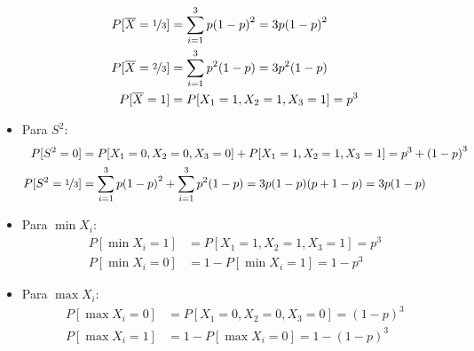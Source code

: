 \begin{ejercicio}
\begin{itemize}
\begin{align*}
               P[\overline{X} = \nicefrac{1}{3}] &= \sum_{i=1}^{3}p{(1-p)}^{2} = 3p{(1-p)}^{2} \\
               P[\overline{X} = \nicefrac{2}{3}] &= \sum_{i=1}^{3}p^2(1-p) = 3p^2(1-p) \\
               P[\overline{X} = 1] &= P[X_1 = 1, X_2 = 1, X_3 = 1] = p^3
           \end{align*}
       \item Para $S^2$:
           \begin{align*}
               P[S^2 = 0] &= P[X_1 = 0, X_2 = 0, X_3 = 0] + P[X_1 = 1, X_2 = 1, X_3 = 1] = p^3 + {(1-p)}^{3} \\
               P[S^2 = \nicefrac{1}{3}] &= \sum_{i=1}^{3} p{(1-p)}^{2} + \sum_{i=1}^{3}p^2(1-p) = 3p(1-p)(p+1-p) = 3p(1-p)
           \end{align*}
       \item Para $\min X_i$:
           \begin{align*}
               P[\min X_i = 1] &= P[X_1 = 1, X_2 = 1, X_3 = 1] = p^3 \\
               P[\min X_i = 0] &= 1-P[\min X_i = 1] = 1-p^3
           \end{align*}
       \item Para $\max X_i$:
           \begin{align*}
               P[\max X_i = 0] &= P[X_1 = 0, X_2 = 0, X_3 = 0] = {(1-p)}^{3}\\
               P[\max X_i = 1] &= 1-P[\max X_i = 0] = 1-{(1-p)}^{3}
           \end{align*}
   \end{itemize}
\end{ejercicio}

